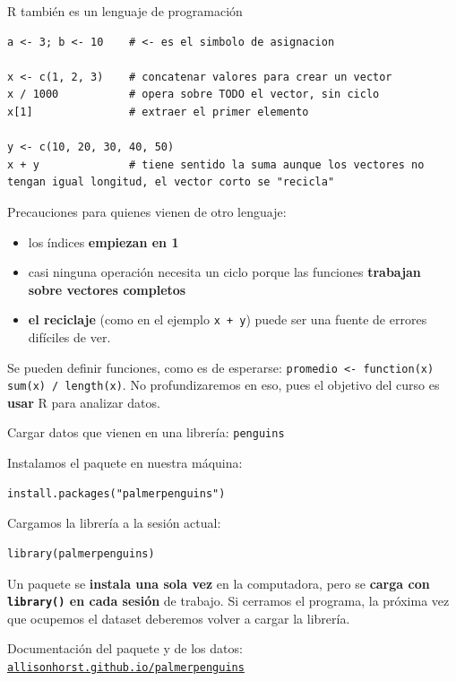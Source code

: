 \documentclass[aspectratio=169,10pt]{beamer}
\newcommand{\Rc}[1]{{\setlength{\fboxsep}{1.6pt}%
  \colorbox{codigoFondo}{\textcolor{codigoTexto}{\texttt{#1}}}}}
\newcommand{\destaca}[1]{%
  \par\vspace{3pt}\noindent
  \colorbox{azulClaro}{%
    \parbox{\dimexpr\linewidth-2\fboxsep\relax}{\vspace{3pt}#1\vspace{3pt}}}%
  \par\vspace{3pt}}
\begin{document}
\begin{frame}[fragile]{R también es un lenguaje de programación}
\begin{lstlisting}
a <- 3; b <- 10    # <- es el simbolo de asignacion

x <- c(1, 2, 3)    # concatenar valores para crear un vector
x / 1000           # opera sobre TODO el vector, sin ciclo
x[1]               # extraer el primer elemento 

y <- c(10, 20, 30, 40, 50)
x + y              # tiene sentido la suma aunque los vectores no tengan igual longitud, el vector corto se "recicla"
\end{lstlisting}

  \vspace{0.2cm}
  \destaca{\small Precauciones para quienes vienen de otro lenguaje:
  \begin{itemize}
      \item los índices \textbf{empiezan en 1}
      \item casi ninguna operación necesita un ciclo
  porque las funciones \textbf{trabajan sobre vectores completos}
  \item \textbf{el reciclaje} (como en el ejemplo \texttt{x + y}) 
  puede ser una fuente de errores difíciles de ver.
  \end{itemize} 
  
  \vspace{0.2cm}
  Se pueden definir funciones, como es de esperarse:
  \Rc{promedio <- function(x) sum(x) / length(x)}. No profundizaremos en eso, pues
  el objetivo del curso es \textbf{usar} R para analizar datos.}
\end{frame}






\begin{frame}[fragile]{Cargar datos que vienen en una librería: \texttt{penguins}}

Instalamos el paquete en nuestra máquina: 
\begin{lstlisting}
install.packages("palmerpenguins")
\end{lstlisting}

\vspace{4mm}
Cargamos la librería a la sesión actual:
\begin{lstlisting}
library(palmerpenguins)
\end{lstlisting}

  \vspace{0.4cm}
  \destaca{\small   Un paquete se \textbf{instala una sola vez} en la computadora, pero se \textbf{carga con \Rc{library()} en cada sesión} de trabajo. Si cerramos el programa, la próxima vez que ocupemos el dataset deberemos volver a cargar la librería.

  \vspace{0.15cm}
  Documentación del paquete y de los datos:
  \href{https://allisonhorst.github.io/palmerpenguins/}{\texttt{allisonhorst.github.io/palmerpenguins}}}
\end{frame}
\end{document}
